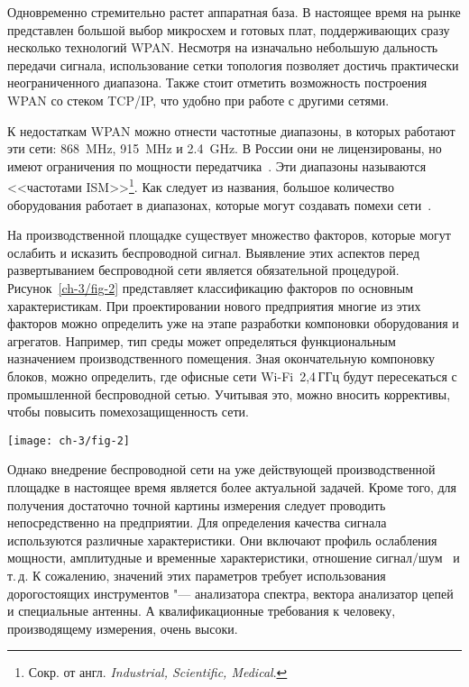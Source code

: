 Одновременно стремительно растет аппаратная база. В настоящее время на рынке представлен большой выбор микросхем и готовых плат, поддерживающих сразу несколько технологий WPAN. Несмотря на изначально небольшую дальность передачи сигнала, использование сетки топология позволяет достичь практически неограниченного диапазона. Также стоит отметить возможность построения WPAN со стеком TCP/IP, что удобно при работе с другими сетями.

К недостаткам WPAN можно отнести частотные диапазоны, в которых работают эти сети: \SI{868}{\mega\hertz}, \SI{915}{\mega\hertz} и \SI{2,4}{\giga\hertz}. В России они не лицензированы, но имеют ограничения по мощности передатчика~\cite{freq}. Эти диапазоны называются <<частотами ISM>>\footnote{Сокр. от англ. \textit{Industrial, Scientific, Medical}.}. Как следует из названия, большое количество оборудования работает в диапазонах, которые могут создавать помехи сети~\cite{750064, 6209430}.

На производственной площадке существует множество факторов, которые могут ослабить и исказить беспроводной сигнал. Выявление этих аспектов перед развертыванием беспроводной сети является обязательной процедурой. Рисунок~\cref{ch-3/fig-2} представляет классификацию факторов по основным характеристикам. При проектировании нового предприятия многие из этих факторов можно определить уже на этапе разработки компоновки оборудования и агрегатов. Например, тип среды может определяться функциональным назначением производственного помещения. Зная окончательную компоновку блоков, можно определить, где офисные сети Wi-Fi~2,4\,ГГц будут пересекаться с промышленной беспроводной сетью. Учитывая это, можно вносить коррективы, чтобы повысить помехозащищенность сети.

\begin{figure*}[ht]
	\centering
	\texttt{[image: ch-3/fig-2]}
	\caption{Классификация факторов ослабления беспроводного сигнала на производственной площадке}
	\label{ch-3/fig-2}
\end{figure*}

Однако внедрение беспроводной сети на уже действующей производственной площадке в настоящее время является более актуальной задачей. Кроме того, для получения достаточно точной картины измерения следует проводить непосредственно на предприятии. Для определения качества сигнала используются различные характеристики. Они включают профиль ослабления мощности, амплитудные и временные характеристики, отношение сигнал/шум~\cite{6133782} и т.\,д. К сожалению, значений этих параметров требует использования дорогостоящих инструментов "--- анализатора спектра, вектора анализатор цепей и специальные антенны. А квалификационные требования к человеку, производящему измерения, очень высоки.

